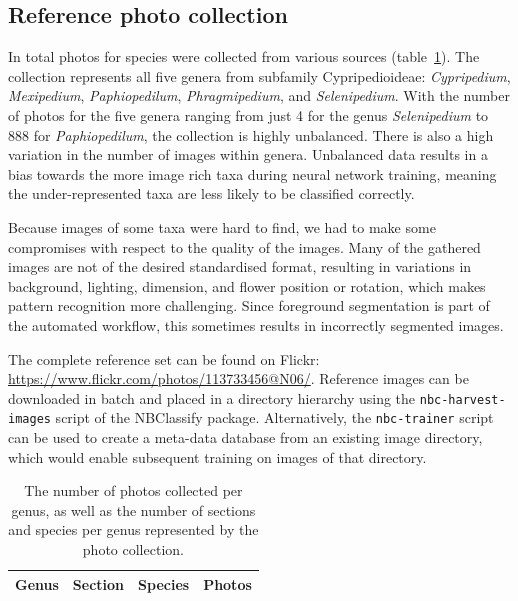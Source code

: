 \documentclass[3p,twocolumn,10pt]{elsarticle}
\begin{document}
\subsection{Reference photo collection}

In total {\PhotoCount} photos for {\SpeciesCount} species were collected from various sources (table~\ref{tbl:photo-counts}). The collection represents all five genera from subfamily Cypripedioideae: \textit{Cypripedium}, \textit{Mexipedium}, \textit{Paphiopedilum}, \textit{Phragmipedium}, and \textit{Selenipedium}. With the number of photos for the five genera ranging from just 4 for the genus \textit{Selenipedium} to 888 for \textit{Paphiopedilum}, the collection is highly unbalanced. There is also a high variation in the number of images within genera. Unbalanced data results in a bias towards the more image rich taxa during neural network training, meaning the under-represented taxa are less likely to be classified correctly.

Because images of some taxa were hard to find, we had to make some compromises with respect to the quality of the images. Many of the gathered images are not of the desired standardised format, resulting in variations in background, lighting, dimension, and flower position or rotation, which makes pattern recognition more challenging. Since foreground segmentation is part of the automated workflow, this sometimes results in incorrectly segmented images.

The complete reference set can be found on Flickr: \url{https://www.flickr.com/photos/113733456@N06/}. Reference images can be downloaded in batch and placed in a directory hierarchy using the \verb/nbc-harvest-images/ script of the NBClassify package. Alternatively, the \verb/nbc-trainer/ script can be used to create a meta-data database from an existing image directory, which would enable subsequent training on images of that directory.

\begin{table}[h]\footnotesize
    \caption{The number of photos collected per genus, as well as the number of sections and species per genus represented by the photo collection.}
    \begin{center}
    \begin{tabular}{llll}
    \toprule
    \textbf{Genus} & \textbf{Section} & \textbf{Species} & \textbf{Photos} \\
    \midrule
    
    \bottomrule
    \end{tabular}
    \end{center}
    \label{tbl:photo-counts}
\end{table}
\end{document}
